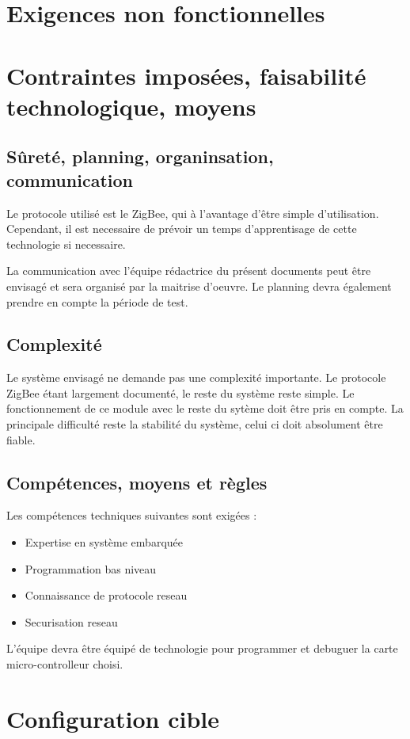 \section{Exigences non fonctionnelles}

\section{Contraintes imposées, faisabilité technologique, moyens}

\subsection{Sûreté, planning, organinsation, communication}
Le protocole utilisé est le ZigBee, qui à l'avantage d'être simple d'utilisation. Cependant, il est necessaire de prévoir un temps d'apprentisage de cette technologie si necessaire. 

La communication avec l'équipe rédactrice du présent documents peut être envisagé et sera organisé par la maitrise d'oeuvre. Le planning devra également prendre en compte la période de test.


\subsection{Complexité}
Le système envisagé ne demande pas une complexité importante. Le protocole ZigBee étant largement documenté, le reste du système reste simple. Le fonctionnement de ce module avec le reste du sytème doit être pris en compte. 
La principale difficulté reste la stabilité du système, celui ci doit absolument être fiable. 

\subsection{Compétences, moyens et règles}
Les compétences techniques suivantes sont exigées :
\begin{itemize}
\item Expertise en système embarquée
\item Programmation bas niveau
\item Connaissance de protocole reseau
\item Securisation reseau
\end{itemize}
L'équipe devra être équipé de technologie pour programmer et debuguer la carte micro-controlleur choisi. 

\section{Configuration cible}

